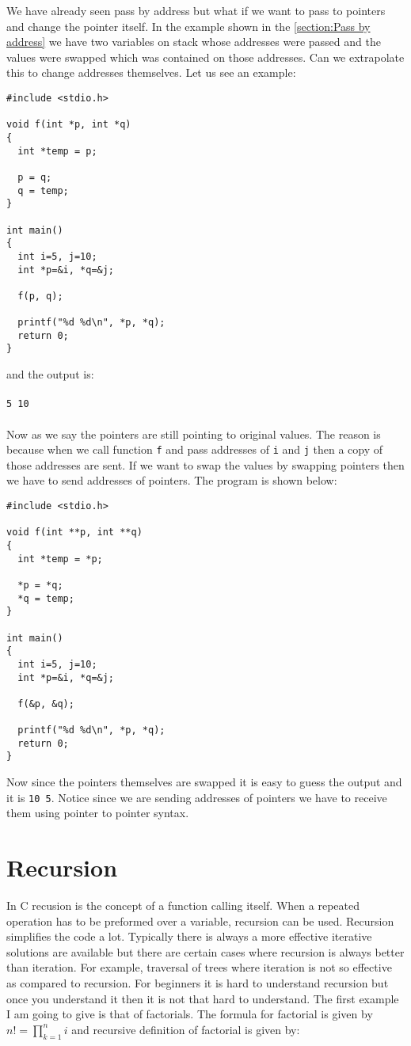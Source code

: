 We have already seen pass by address but what if we want to pass to pointers
and change the pointer itself. In the example shown in the
\autoref{section:Pass by address}  we have two
variables on stack whose addresses were passed and the values were swapped
which was contained on those addresses. Can we extrapolate this to change
addresses themselves. Let us see an example:

\begin{verbatim}
#include <stdio.h>

void f(int *p, int *q)
{
  int *temp = p;

  p = q;
  q = temp;
}

int main()
{
  int i=5, j=10;
  int *p=&i, *q=&j;

  f(p, q);

  printf("%d %d\n", *p, *q);
  return 0;
}
\end{verbatim}
and the output is:
\\\\\texttt{5 10\\\\}
Now as we say the pointers are still pointing to original values. The reason is
because when we call function \texttt{f} and pass addresses of \texttt{i} and
\texttt{j} then a copy of those addresses are sent. If we want to swap the
values by swapping pointers then we have to send addresses of pointers. The
program is shown below:

\begin{verbatim}
#include <stdio.h>

void f(int **p, int **q)
{
  int *temp = *p;

  *p = *q;
  *q = temp;
}

int main()
{
  int i=5, j=10;
  int *p=&i, *q=&j;

  f(&p, &q);

  printf("%d %d\n", *p, *q);
  return 0;
}
\end{verbatim}

Now since the pointers themselves are swapped it is easy to guess the output
and it is \texttt{10 5}. Notice since we are sending addresses of pointers we
have to receive them using pointer to pointer syntax.

\section{Recursion}
In C recusion is the concept of a function calling itself. When a repeated
operation has to be preformed over a variable, recursion can be used. Recursion
simplifies the code a lot. Typically there is always a more effective iterative
solutions are available but there are certain cases where recursion is always
better than iteration. For example, traversal of trees where iteration is not
so effective as compared to recursion. For beginners it is hard to understand
recursion but once you understand it then it is not that hard to
understand. The first example I am going to give is that of factorials. The
formula for factorial is given by $n!=\prod_{k=1}^{n}i$  and recursive
definition of factorial is given by:

